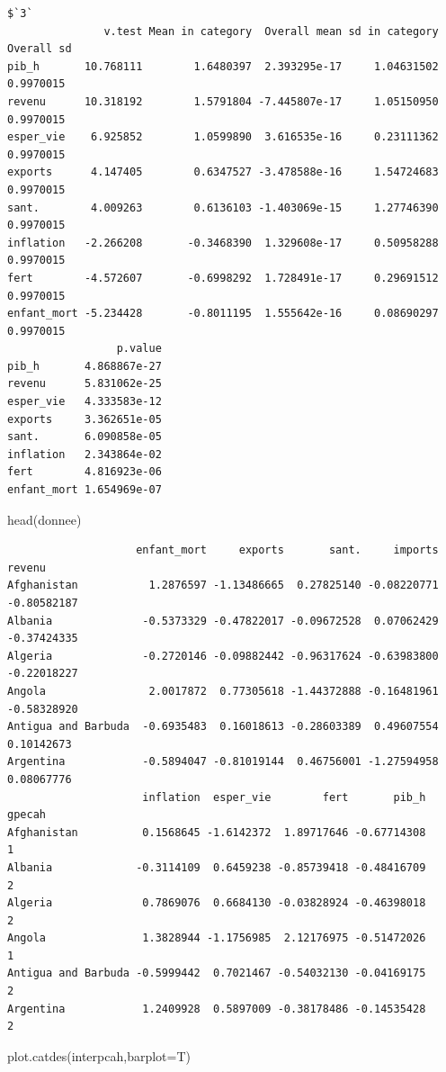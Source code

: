 \documentclass[
]{article}
\newenvironment{Shaded}{}{}
\newcommand{\AttributeTok}[1]{#1}
\newcommand{\FunctionTok}[1]{#1}
\newcommand{\NormalTok}[1]{#1}
\begin{document}
\begin{verbatim}
$`3`
               v.test Mean in category  Overall mean sd in category Overall sd
pib_h       10.768111        1.6480397  2.393295e-17     1.04631502  0.9970015
revenu      10.318192        1.5791804 -7.445807e-17     1.05150950  0.9970015
esper_vie    6.925852        1.0599890  3.616535e-16     0.23111362  0.9970015
exports      4.147405        0.6347527 -3.478588e-16     1.54724683  0.9970015
sant.        4.009263        0.6136103 -1.403069e-15     1.27746390  0.9970015
inflation   -2.266208       -0.3468390  1.329608e-17     0.50958288  0.9970015
fert        -4.572607       -0.6998292  1.728491e-17     0.29691512  0.9970015
enfant_mort -5.234428       -0.8011195  1.555642e-16     0.08690297  0.9970015
                 p.value
pib_h       4.868867e-27
revenu      5.831062e-25
esper_vie   4.333583e-12
exports     3.362651e-05
sant.       6.090858e-05
inflation   2.343864e-02
fert        4.816923e-06
enfant_mort 1.654969e-07
\end{verbatim}

\begin{Shaded}
\begin{Highlighting}[]
\FunctionTok{head}\NormalTok{(donnee)}
\end{Highlighting}
\end{Shaded}

\begin{verbatim}
                    enfant_mort     exports       sant.     imports      revenu
Afghanistan           1.2876597 -1.13486665  0.27825140 -0.08220771 -0.80582187
Albania              -0.5373329 -0.47822017 -0.09672528  0.07062429 -0.37424335
Algeria              -0.2720146 -0.09882442 -0.96317624 -0.63983800 -0.22018227
Angola                2.0017872  0.77305618 -1.44372888 -0.16481961 -0.58328920
Antigua and Barbuda  -0.6935483  0.16018613 -0.28603389  0.49607554  0.10142673
Argentina            -0.5894047 -0.81019144  0.46756001 -1.27594958  0.08067776
                     inflation  esper_vie        fert       pib_h gpecah
Afghanistan          0.1568645 -1.6142372  1.89717646 -0.67714308      1
Albania             -0.3114109  0.6459238 -0.85739418 -0.48416709      2
Algeria              0.7869076  0.6684130 -0.03828924 -0.46398018      2
Angola               1.3828944 -1.1756985  2.12176975 -0.51472026      1
Antigua and Barbuda -0.5999442  0.7021467 -0.54032130 -0.04169175      2
Argentina            1.2409928  0.5897009 -0.38178486 -0.14535428      2
\end{verbatim}

\begin{Shaded}
\begin{Highlighting}[]
\FunctionTok{plot.catdes}\NormalTok{(interpcah,}\AttributeTok{barplot=}\NormalTok{T)}
\end{Highlighting}
\end{Shaded}
\end{document}
